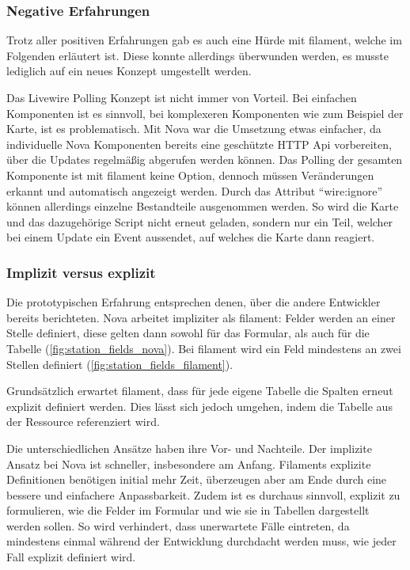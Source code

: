 \subsubsection{Negative Erfahrungen}
Trotz aller positiven Erfahrungen gab es auch eine Hürde mit filament, welche im Folgenden erläutert ist.
Diese konnte allerdings überwunden werden, es musste lediglich auf ein neues Konzept umgestellt werden.

Das Livewire Polling Konzept ist nicht immer von Vorteil.
Bei einfachen Komponenten ist es sinnvoll, bei komplexeren Komponenten wie zum Beispiel der Karte, ist es problematisch.
Mit Nova war die Umsetzung etwas einfacher, da individuelle Nova Komponenten bereits eine geschützte HTTP Api vorbereiten, über die Updates regelmäßig abgerufen werden können.
Das Polling der gesamten Komponente ist mit filament keine Option, dennoch müssen Veränderungen erkannt und automatisch angezeigt werden.
Durch das Attribut \enquote{wire:ignore} können allerdings einzelne Bestandteile ausgenommen werden.
So wird die Karte und das dazugehörige Script nicht erneut geladen, sondern nur ein Teil, welcher bei einem Update ein Event aussendet, auf welches die Karte dann reagiert.

\newpage

\subsubsection{Implizit versus explizit}
Die prototypischen Erfahrung entsprechen denen, über die andere Entwickler\cite{reddit-laravel-nova-vs-filament} bereits berichteten.
Nova arbeitet impliziter als filament:
Felder werden an einer Stelle definiert, diese gelten dann sowohl für das Formular, als auch für die Tabelle (\ref{fig:station_fields_nova}).
Bei filament wird ein Feld mindestens an zwei Stellen definiert (\ref{fig:station_fields_filament}).

Grundsätzlich erwartet filament, dass für jede eigene Tabelle die Spalten erneut explizit definiert werden.
Dies lässt sich jedoch umgehen, indem die Tabelle aus der Ressource referenziert wird.

Die unterschiedlichen Ansätze haben ihre Vor- und Nachteile.
Der implizite Ansatz bei Nova ist schneller, insbesondere am Anfang.
Filaments explizite Definitionen benötigen initial mehr Zeit, überzeugen aber am Ende durch eine bessere und einfachere Anpassbarkeit.
Zudem ist es durchaus sinnvoll, explizit zu formulieren, wie die Felder im Formular und wie sie in Tabellen dargestellt werden sollen.
So wird verhindert, dass unerwartete Fälle eintreten, da mindestens einmal während der Entwicklung durchdacht werden muss, wie jeder Fall explizit definiert wird.

